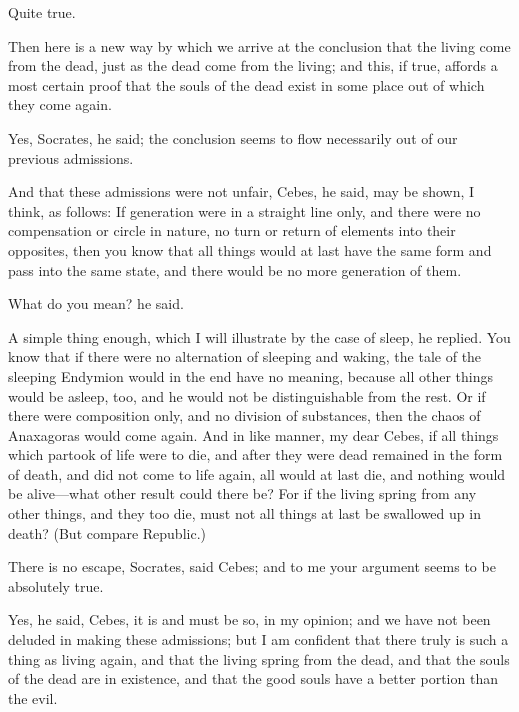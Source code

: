 \documentclass[11pt,letter]{article}
\begin{document}
\par  Quite true.

\par  Then here is a new way by which we arrive at the conclusion that the living come from the dead, just as the dead come from the living; and this, if true, affords a most certain proof that the souls of the dead exist in some place out of which they come again.

\par  Yes, Socrates, he said; the conclusion seems to flow necessarily out of our previous admissions.

\par  And that these admissions were not unfair, Cebes, he said, may be shown, I think, as follows: If generation were in a straight line only, and there were no compensation or circle in nature, no turn or return of elements into their opposites, then you know that all things would at last have the same form and pass into the same state, and there would be no more generation of them.

\par  What do you mean? he said.

\par  A simple thing enough, which I will illustrate by the case of sleep, he replied. You know that if there were no alternation of sleeping and waking, the tale of the sleeping Endymion would in the end have no meaning, because all other things would be asleep, too, and he would not be distinguishable from the rest. Or if there were composition only, and no division of substances, then the chaos of Anaxagoras would come again. And in like manner, my dear Cebes, if all things which partook of life were to die, and after they were dead remained in the form of death, and did not come to life again, all would at last die, and nothing would be alive—what other result could there be? For if the living spring from any other things, and they too die, must not all things at last be swallowed up in death? (But compare Republic.)

\par  There is no escape, Socrates, said Cebes; and to me your argument seems to be absolutely true.

\par  Yes, he said, Cebes, it is and must be so, in my opinion; and we have not been deluded in making these admissions; but I am confident that there truly is such a thing as living again, and that the living spring from the dead, and that the souls of the dead are in existence, and that the good souls have a better portion than the evil.
\end{document}
